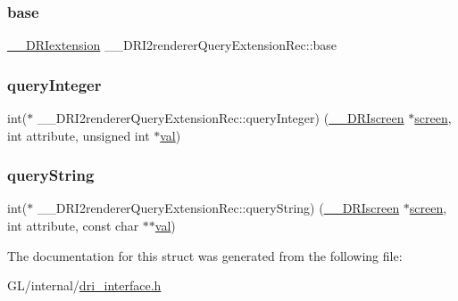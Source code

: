 \subsubsection{\texorpdfstring{base}{base}}
{\footnotesize\ttfamily \hyperlink{dri__interface_8h_a4e0a61c8ece00d2b2c6792a9a1b55385}{\+\_\+\+\_\+\+D\+R\+Iextension} \+\_\+\+\_\+\+D\+R\+I2renderer\+Query\+Extension\+Rec\+::base}

\mbox{\label{struct_____d_r_i2renderer_query_extension_rec_a17378509e2f471d61a2dbdb47d9eb185}} 
\subsubsection{\texorpdfstring{query\+Integer}{queryInteger}}
{\footnotesize\ttfamily int($\ast$ \+\_\+\+\_\+\+D\+R\+I2renderer\+Query\+Extension\+Rec\+::query\+Integer) (\hyperlink{dri__interface_8h_a9961b01d421ee1fd6ed3c05acc9ca561}{\+\_\+\+\_\+\+D\+R\+Iscreen} $\ast$\hyperlink{cad_8h_ae04e09e4e3831bfc1632c509ae37dcec}{screen}, int attribute, unsigned int $\ast$\hyperlink{glcorearb_8h_a26942fd2ed566ef553eae82d2c109c8f}{val})}

\mbox{\label{struct_____d_r_i2renderer_query_extension_rec_a353801b3ff0c1566da07251949c7dc78}} 
\subsubsection{\texorpdfstring{query\+String}{queryString}}
{\footnotesize\ttfamily int($\ast$ \+\_\+\+\_\+\+D\+R\+I2renderer\+Query\+Extension\+Rec\+::query\+String) (\hyperlink{dri__interface_8h_a9961b01d421ee1fd6ed3c05acc9ca561}{\+\_\+\+\_\+\+D\+R\+Iscreen} $\ast$\hyperlink{cad_8h_ae04e09e4e3831bfc1632c509ae37dcec}{screen}, int attribute, const char $\ast$$\ast$\hyperlink{glcorearb_8h_a26942fd2ed566ef553eae82d2c109c8f}{val})}



The documentation for this struct was generated from the following file\+:\begin{DoxyCompactItemize}
\item 
G\+L/internal/\hyperlink{dri__interface_8h}{dri\+\_\+interface.\+h}\end{DoxyCompactItemize}
